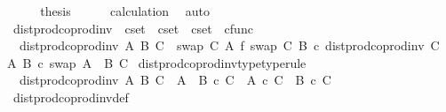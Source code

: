 \begin{isabellebody}
\ \ \isamarkupfalse%
\ \isamarkupfalse%
\ {\isacharquery}{\kern0pt}thesis\isanewline
\ \ \ \ \isamarkupfalse%
\ calculation\ \isamarkupfalse%
\ auto\isanewline
{}\isamarkupfalse%
%
\endisatagproof
{\isafoldproof}%
%
\isadelimproof
%
\endisadelimproof
%
\isadelimdocument
%
\endisadelimdocument
%
\isatagdocument
%
\isamarkuptrue%
%
\endisatagdocument
{\isafolddocument}%
%
\isadelimdocument
%
\endisadelimdocument
{}\isamarkupfalse%
\ dist{\isacharunderscore}{\kern0pt}prod{\isacharunderscore}{\kern0pt}coprod{\isacharunderscore}{\kern0pt}inv{}\ {\isacharcolon}{\kern0pt}{\isacharcolon}{\kern0pt}\ {\isachardoublequoteopen}cset\ {\isasymRightarrow}\ cset\ {\isasymRightarrow}\ cset\ {\isasymRightarrow}\ cfunc{\isachardoublequoteclose}\ \isanewline
\ \ {\isachardoublequoteopen}dist{\isacharunderscore}{\kern0pt}prod{\isacharunderscore}{\kern0pt}coprod{\isacharunderscore}{\kern0pt}inv{}\ A\ B\ C\ {\isacharequal}{\kern0pt}\ {\isacharparenleft}{\kern0pt}swap\ C\ A\ {\isasymbowtie}\isactrlsub f\ swap\ C\ B{\isacharparenright}{\kern0pt}\ {\isasymcirc}\isactrlsub c\ dist{\isacharunderscore}{\kern0pt}prod{\isacharunderscore}{\kern0pt}coprod{\isacharunderscore}{\kern0pt}inv\ C\ A\ B\ {\isasymcirc}\isactrlsub c\ swap\ {\isacharparenleft}{\kern0pt}A\ {\isasymCoprod}\ B{\isacharparenright}{\kern0pt}\ C{\isachardoublequoteclose}\isanewline
\isanewline
{}\isamarkupfalse%
\ dist{\isacharunderscore}{\kern0pt}prod{\isacharunderscore}{\kern0pt}coprod{\isacharunderscore}{\kern0pt}inv{}{\isacharunderscore}{\kern0pt}type{\isacharbrackleft}{\kern0pt}type{\isacharunderscore}{\kern0pt}rule{\isacharbrackright}{\kern0pt}{\isacharcolon}{\kern0pt}\isanewline
\ \ {\isachardoublequoteopen}dist{\isacharunderscore}{\kern0pt}prod{\isacharunderscore}{\kern0pt}coprod{\isacharunderscore}{\kern0pt}inv{}\ A\ B\ C\ {\isacharcolon}{\kern0pt}\ {\isacharparenleft}{\kern0pt}A\ {\isasymCoprod}\ B{\isacharparenright}{\kern0pt}\ {\isasymtimes}\isactrlsub c\ C\ {\isasymrightarrow}\ {\isacharparenleft}{\kern0pt}A\ {\isasymtimes}\isactrlsub c\ C{\isacharparenright}{\kern0pt}\ {\isasymCoprod}\ {\isacharparenleft}{\kern0pt}B\ {\isasymtimes}\isactrlsub c\ C{\isacharparenright}{\kern0pt}{\isachardoublequoteclose}\isanewline
%
\isadelimproof
\ \ %
\endisadelimproof
%
\isatagproof
{}\isamarkupfalse%
\ dist{\isacharunderscore}{\kern0pt}prod{\isacharunderscore}{\kern0pt}coprod{\isacharunderscore}{\kern0pt}inv{}{\isacharunderscore}{\kern0pt}def\ \isamarkupfalse%

\end{isabellebody}
